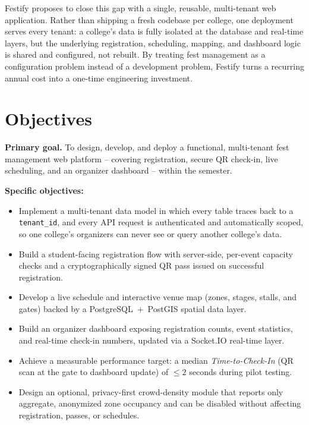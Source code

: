 \documentclass[11pt,a4paper]{article}
\begin{document}
Festify proposes to close this gap with a single, reusable, multi-tenant web
application. Rather than shipping a fresh codebase per college, one deployment serves
every tenant: a college's data is fully isolated at the database and real-time layers,
but the underlying registration, scheduling, mapping, and dashboard logic is shared and
configured, not rebuilt. By treating fest management as a configuration problem instead
of a development problem, Festify turns a recurring annual cost into a one-time
engineering investment.

\section{Objectives}

\textbf{Primary goal.} To design, develop, and deploy a functional, multi-tenant fest
management web platform -- covering registration, secure QR check-in, live scheduling,
and an organizer dashboard -- within the semester.

\textbf{Specific objectives:}
\begin{itemize}
    \item Implement a multi-tenant data model in which every table traces back to a
    \texttt{tenant\_id}, and every API request is authenticated and automatically
    scoped, so one college's organizers can never see or query another college's data.
    \item Build a student-facing registration flow with server-side, per-event capacity
    checks and a cryptographically signed QR pass issued on successful registration.
    \item Develop a live schedule and interactive venue map (zones, stages, stalls, and
    gates) backed by a PostgreSQL~+~PostGIS spatial data layer.
    \item Build an organizer dashboard exposing registration counts, event statistics,
    and real-time check-in numbers, updated via a Socket.IO real-time layer.
    \item Achieve a measurable performance target: a median \emph{Time-to-Check-In}
    (QR scan at the gate to dashboard update) of $\leq 2$ seconds during pilot testing.
    \item Design an optional, privacy-first crowd-density module that reports only
    aggregate, anonymized zone occupancy and can be disabled without affecting
    registration, passes, or schedules.
\end{itemize}
\end{document}
